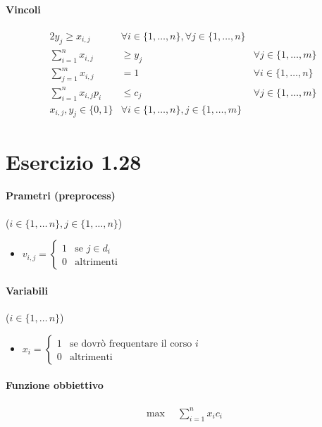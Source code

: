 \documentclass{article}
\begin{document}
\paragraph{Vincoli}
\begin{alignat}{2}
  y_j \geq x_{i,j} &\forall i \in \{1,\ldots,n\}, \forall j \in \{1,\ldots,n\} \\
  \sum_{i=1}^n x_{i,j} &\geq y_j &\forall j \in \{1,\ldots,m\} \\
  \sum_{j=1}^m x_{i,j} &=1  &\forall i \in \{1,\ldots,n\} \\
  \sum_{i=1}^n x_{i,j} p_i &\leq c_j  &\forall j \in \{1,\ldots,m\} \\
  x_{i,j}, y_j \in \{0,1\} &\forall i \in \{1,\ldots,n\}, j \in \{1,\ldots,m\}
\end{alignat}

\pagebreak
\section{Esercizio 1.28}

\paragraph{Prametri (preprocess)} ($i \in \{1,\ldots\,n\}, j \in \{1,\ldots,n\}$)
\begin{itemize}
  \item $v_{i,j} = \begin{cases}
      1 & \text{se }j \in d_i \\
      0 & \text{altrimenti}
  \end{cases}$
\end{itemize}

\paragraph{Variabili} ($i \in \{1,\ldots\,n\}$)
\begin{itemize}
  \item $x_i = \begin{cases}
      1 & \text{se dovr\`o frequentare il corso }i\\
      0 & \text{altrimenti}
  \end{cases}$
\end{itemize}

\paragraph{Funzione obbiettivo}
\begin{align*}
  \max \quad \sum_{i=1}^n x_i c_i
\end{align*}
\end{document}
